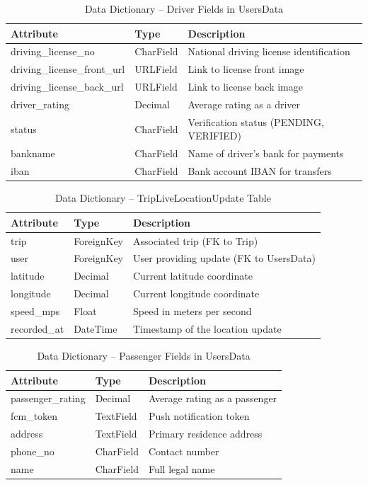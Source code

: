 \begin{table}[H]
\centering
\caption{Data Dictionary – Driver Fields in UsersData}
\renewcommand{\arraystretch}{1.5}
\begin{tabular}{|p{3cm}|p{3cm}|p{7cm}|}
\hline
\textbf{Attribute} & \textbf{Type} & \textbf{Description} \\
\hline
driving\_license\_no & CharField & National driving license identification \\
\hline
driving\_license\_front\_url & URLField & Link to license front image \\
\hline
driving\_license\_back\_url & URLField & Link to license back image \\
\hline
driver\_rating & Decimal & Average rating as a driver \\
\hline
status & CharField & Verification status (PENDING, VERIFIED) \\
\hline
bankname & CharField & Name of driver's bank for payments \\
\hline
iban & CharField & Bank account IBAN for transfers \\
\hline
\end{tabular}
\end{table}

\begin{table}[H]
\centering
\caption{Data Dictionary – TripLiveLocationUpdate Table}
\renewcommand{\arraystretch}{1.5}
\begin{tabular}{|p{3cm}|p{3cm}|p{7cm}|}
\hline
\textbf{Attribute} & \textbf{Type} & \textbf{Description} \\
\hline
trip & ForeignKey & Associated trip (FK to Trip) \\
\hline
user & ForeignKey & User providing update (FK to UsersData) \\
\hline
latitude & Decimal & Current latitude coordinate \\
\hline
longitude & Decimal & Current longitude coordinate \\
\hline
speed\_mps & Float & Speed in meters per second \\
\hline
recorded\_at & DateTime & Timestamp of the location update \\
\hline
\end{tabular}
\end{table}

\begin{table}[H]
\centering
\caption{Data Dictionary – Passenger Fields in UsersData}
\renewcommand{\arraystretch}{1.5}
\begin{tabular}{|p{3cm}|p{3cm}|p{7cm}|}
\hline
\textbf{Attribute} & \textbf{Type} & \textbf{Description} \\
\hline
passenger\_rating & Decimal & Average rating as a passenger \\
\hline
fcm\_token & TextField & Push notification token \\
\hline
address & TextField & Primary residence address \\
\hline
phone\_no & CharField & Contact number \\
\hline
name & CharField & Full legal name \\
\hline
\end{tabular}
\end{table}

